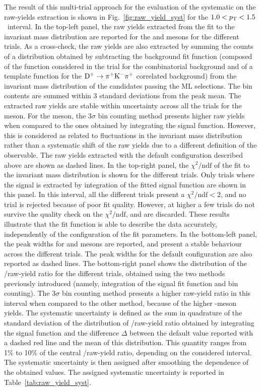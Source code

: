 The result of this multi-trial approach for the evaluation of the systematic on the raw-yields extraction is shown in Fig.~\ref{fig:raw_yield_syst} for the $1.0<p_\mathrm{T}<1.5$~\gevc interval. In the top-left panel, the raw yields extracted from the fit to the invariant mass distribution are reported for the \ds and \dpl mesons for the different trials. As a cross-check, the raw yields are also extracted by summing the counts of a distribution obtained by subtracting the background fit function (composed of the function considered in the trial for the combinatorial background and of a template function for the $\mathrm{D^+}\rightarrow\mathrm{\pi^+K^-\pi^+}$ correlated background) from the invariant mass distribution of the candidates passing the ML selections. The bin contents are summed within 3 standard deviations from the peak mean. The extracted raw yields are stable within uncertainty across all the trials for the \dpl meson. For the \ds meson, the $3\sigma$ bin counting method presents higher raw yields when compared to the ones obtained by integrating the signal function. However, this is considered as related to fluctuations in the invariant mass distribution rather than a systematic shift of the raw yields due to a different definition of the observable. The raw yields extracted with the default configuration described above are shown as dashed lines. In the top-right panel, the $\chi^2/\mathrm{ndf}$ of the fit to the invariant mass distribution is shown for the different trials. Only trials where the signal is extracted by integration of the fitted signal function are shown in this panel. In this \pt interval, all the different trials present a $\chi^2/\mathrm{ndf}<2$, and no trial is rejected because of poor fit quality. However, at higher \pt a few trials do not survive the quality check on the $\chi^2/\mathrm{ndf}$, and are discarded. These results illustrate that the fit function is able to describe the data accurately, independently of the configuration of the fit parameters. In the bottom-left panel, the peak widths for \ds and \dpl mesons are reported, and present a stable behaviour across the different trials. The peak widths for the default configuration are also reported as dashed lines. The bottom-right panel shows the distribution of the \ds/\dpl raw-yield ratio for the different trials, obtained using the two methods previously introduced (namely, integration of the signal fit function and bin counting). The $3\sigma$ bin counting method presents a higher raw-yield ratio in this \pt interval when compared to the other method, because of the higher \ds-meson yields. The systematic uncertainty is defined as the sum in quadrature of the standard deviation of the distribution of \ds/\dpl raw-yield ratio obtained by integrating the signal function and the difference $\Delta$ between the default value reported with a dashed red line and the mean of this distribution. This quantity ranges from 1\% to 10\% of the central \ds/\dpl raw-yield ratio, depending on the considered \pt interval. The systematic uncertainty is then assigned after smoothing the \pt dependence of the obtained values. The assigned systematic uncertainty is reported in Table~\ref{tab:raw_yield_syst}.





